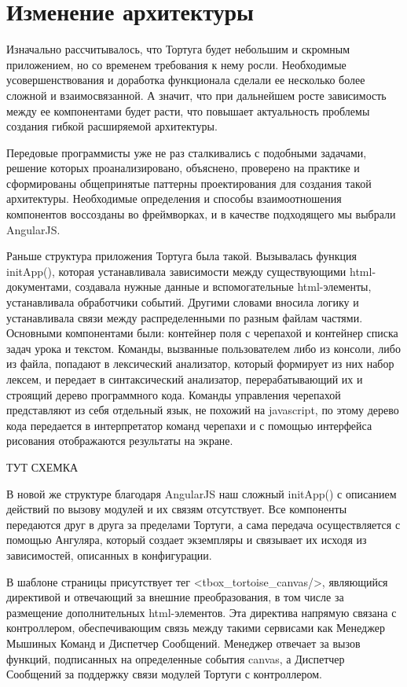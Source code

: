 \section{Изменение архитектуры} \label{sect1_1}
Изначально рассчитывалось, что Тортуга будет небольшим и скромным приложением, но со временем требования к нему росли. Необходимые усовершенствования и доработка функционала сделали ее несколько более сложной и взаимосвязанной. А значит, что при дальнейшем росте зависимость между ее компонентами будет расти, что повышает актуальность проблемы создания гибкой расширяемой архитектуры. 

Передовые программисты уже не раз сталкивались с подобными задачами, решение которых проанализировано, объяснено, проверено на практике и сформированы общепринятые паттерны проектирования для создания такой архитектуры. Необходимые определения и способы взаимоотношения компонентов воссозданы во фреймворках, и в качестве подходящего мы выбрали AngularJS.

Раньше структура приложения Тортуга была такой. Вызывалась функция initApp(), которая устанавливала зависимости между существующими html-документами, создавала нужные данные и вспомогательные html-элементы, устанавливала обработчики событий. Другими словами вносила логику и устанавливала связи между распределенными по разным файлам частями. Основными компонентами были: контейнер поля с черепахой и контейнер списка задач урока и текстом. Команды, вызванные пользователем либо из консоли, либо из файла, попадают в лексический анализатор, который формирует из них набор лексем, и передает в синтаксический анализатор, перерабатывающий их и строящий дерево программного кода. Команды управления черепахой представляют из себя отдельный язык, не похожий на javascript, по этому дерево кода передается в интерпретатор команд черепахи и с помощью интерфейса рисования отображаются результаты на экране.

\vspace{6mm}
ТУТ СХЕМКА
\vspace{6mm}

В новой же структуре благодаря AngularJS наш сложный initApp() с описанием действий по вызову модулей  и их связям отсутствует. Все компоненты передаются друг в друга за пределами Тортуги, а сама передача осуществляется с помощью Ангуляра, который создает экземпляры и связывает их исходя из зависимостей, описанных в конфигурации.

В шаблоне страницы присутствует тег <tbox\_tortoise\_canvas/>, являющийся директивой  и отвечающий за внешние преобразования, в том числе за размещение дополнительных html-элементов. Эта директива напрямую связана с контроллером, обеспечивающим связь между такими сервисами как Менеджер Мышиных Команд  и Диспетчер Сообщений. Менеджер отвечает за вызов функций, подписанных на определенные события canvas, а Диспетчер Сообщений за поддержку связи модулей Тортуги с контроллером.

